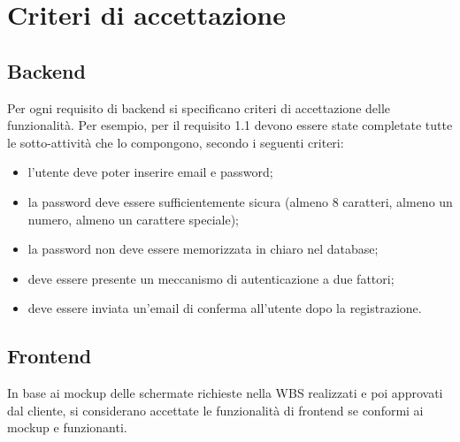 \documentclass[a4paper,12pt]{article}
\begin{document}
\section{Criteri di accettazione}

\subsection{Backend}
Per ogni requisito di backend si specificano criteri di accettazione delle funzionalità. Per esempio, per il requisito
1.1 devono essere state completate tutte le sotto-attività che lo compongono, secondo i seguenti criteri:
\begin{itemize}
    \item l'utente deve poter inserire email e password;
    \item la password deve essere sufficientemente sicura (almeno 8 caratteri, almeno un numero, almeno un carattere speciale);
    \item la password non deve essere memorizzata in chiaro nel database;
    \item deve essere presente un meccanismo di autenticazione a due fattori;
    \item deve essere inviata un'email di conferma all'utente dopo la registrazione.
\end{itemize}

\subsection{Frontend}
In base ai mockup delle schermate richieste nella WBS realizzati e poi approvati dal cliente, si considerano accettate
le funzionalità di frontend se conformi ai mockup e funzionanti.
\end{document}
